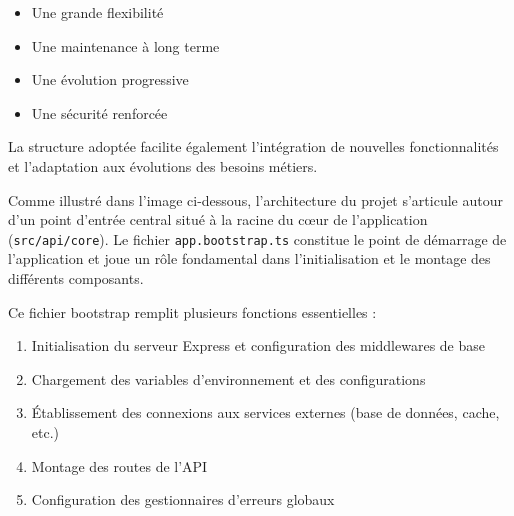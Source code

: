 {\begin{enumerate}
\begin{description}
\begin{itemize}
    
    \item Une grande flexibilité
\item Une maintenance à long terme
\item Une évolution progressive
\item Une sécurité renforcée 
\end{itemize}

\vspace{0.35cm}
    
La structure adoptée facilite également l'intégration de nouvelles fonctionnalités et l'adaptation aux évolutions des besoins métiers.

\end{description}

Comme illustré dans l'image ci-dessous, l'architecture du projet s'articule autour d'un point d'entrée central situé à la racine du cœur de l'application (\verb|src/api/core|). Le fichier \verb|app.bootstrap.ts| constitue le point de démarrage de l'application et joue un rôle fondamental dans l'initialisation et le montage des différents composants.

\vspace{0.35cm}

Ce fichier bootstrap remplit plusieurs fonctions essentielles :

\begin{enumerate}
    \item Initialisation du serveur Express et configuration des middlewares de base
    \item Chargement des variables d'environnement et des configurations
    \item Établissement des connexions aux services externes (base de données, cache, etc.)
    \item Montage des routes de l'API
    \item Configuration des gestionnaires d'erreurs globaux
\end{enumerate}

\vspace{0.35cm}


\end{enumerate}}

